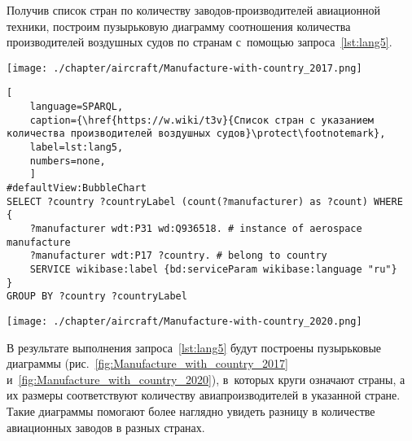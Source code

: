 
Получив список стран по количеству заводов-производителей авиационной техники, 
построим пузырьковую диаграмму 
соотношения количества производителей воздушных судов по странам 
с~помощью запроса~\ref{lst:lang5}.

\begin{marginfigure}[0\baselineskip]
\centering
	\texttt{[image: ./chapter/aircraft/Manufacture-with-country\_2017.png]}
	\caption{Соотношение количества производителей воздушных судов по~странам, 2017 год}
	\label{fig:Manufacture_with_country_2017}
\end{marginfigure}


\begin{lstlisting}[ 
    language=SPARQL, 
    caption={\href{https://w.wiki/t3v}{Список стран с указанием количества производителей воздушных судов}\protect\footnotemark}, 
    label=lst:lang5, 
    numbers=none,
    ]
#defaultView:BubbleChart
SELECT ?country ?countryLabel (count(?manufacturer) as ?count) WHERE
{
    ?manufacturer wdt:P31 wd:Q936518. # instance of aerospace manufacture
  	?manufacturer wdt:P17 ?country. # belong to country
    SERVICE wikibase:label {bd:serviceParam wikibase:language "ru"}
}
GROUP BY ?country ?countryLabel
\end{lstlisting}

\begin{marginfigure}
\centering
	\texttt{[image: ./chapter/aircraft/Manufacture-with-country\_2020.png]}
	\caption{Соотношение количества производителей воздушных судов по~странам, 2020 год}
	\label{fig:Manufacture_with_country_2020}
\end{marginfigure}

В результате выполнения запроса~\ref{lst:lang5} будут построены пузырьковые диаграммы 
(рис.~\ref{fig:Manufacture_with_country_2017} и~\ref{fig:Manufacture_with_country_2020}), 
в~которых круги означают страны, 
а их размеры соответствуют количеству авиапроизводителей в указанной стране. 
Такие диаграммы помогают более наглядно увидеть разницу в количестве авиационных заводов в разных странах.


